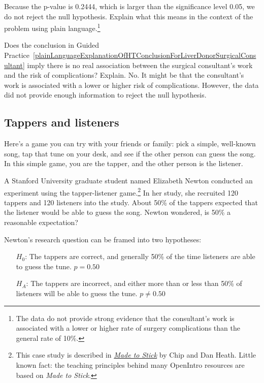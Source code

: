 \begin{exercise} \label{plainLanguageExplanationOfHTConclusionForLiverDonorSurgicalConsultant}
Because the p-value is 0.2444, which is larger than the significance level 0.05, we do not reject the null hypothesis. Explain what this means in the context of the problem using plain language.\footnote{The data do not provide strong evidence that the consultant's work is associated with a lower or higher rate of surgery complications than the general rate of 10\%.}
\end{exercise}

\begin{example}{Does the conclusion in Guided Practice~\ref{plainLanguageExplanationOfHTConclusionForLiverDonorSurgicalConsultant} imply there is no real association between the surgical consultant's work and the risk of complications? Explain.}
No. It might be that the consultant's work is associated with a lower or higher risk of complications. However, the data did not provide enough information to reject the null hypothesis. %
\end{example}


\subsection{Tappers and listeners}

Here's a game you can try with your friends or family: pick a simple, well-known song, tap that tune on your desk, and see if the other person can guess the song. In this simple game, you are the tapper, and the other person is the listener.

A Stanford University graduate student named Elizabeth Newton conducted an experiment using the tapper-listener game.\footnote{This case study is described in \emph{\href{http://www.openintro.org/redirect.php?go=made-to-stick&redirect=simulation_textbook_pdf_preliminary}{Made to Stick}} by Chip and Dan Heath. Little known fact: the teaching principles behind many OpenIntro resources are based on \emph{Made to Stick}.} In her study, she recruited 120 tappers and 120 listeners into the study. About 50\% of the tappers expected that the listener would be able to guess the song. Newton wondered, is 50\% a reasonable expectation?

Newton's research question can be framed into two hypotheses:
\begin{itemize}
\setlength{\itemsep}{0mm}
\item[$H_0$:] The tappers are correct, and generally 50\% of the time listeners are able to guess the tune. $p = 0.50$
\item[$H_A$:] The tappers are incorrect, and either more than or less than 50\% of listeners will be able to guess the tune. $p \neq 0.50$
\end{itemize}

